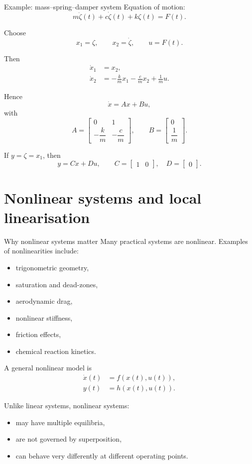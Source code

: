 \documentclass[aspectratio=169,10pt]{beamer}
\begin{document}
\begin{frame}{Example: mass--spring--damper system}
Equation of motion:
\[
m\ddot{\zeta}(t)+c\dot{\zeta}(t)+k\zeta(t)=F(t).
\]

Choose
\[
x_1=\zeta,\qquad x_2=\dot{\zeta},\qquad u=F(t).
\]

Then
\begin{align*}
\dot{x}_1 &= x_2,\\
\dot{x}_2 &= -\frac{k}{m}x_1-\frac{c}{m}x_2+\frac{1}{m}u.
\end{align*}

Hence
\[
\dot{x}=Ax+Bu,
\]
with
\[
A=
\begin{bmatrix}
0 & 1\\[4pt]
-\dfrac{k}{m} & -\dfrac{c}{m}
\end{bmatrix},
\qquad
B=
\begin{bmatrix}
0\\[4pt]
\dfrac{1}{m}
\end{bmatrix}.
\]

If \(y=\zeta=x_1\), then
\[
y=Cx+Du,\qquad
C=\begin{bmatrix}1 & 0\end{bmatrix},\quad D=\begin{bmatrix}0\end{bmatrix}.
\]
\end{frame}

\section{Nonlinear systems and local linearisation}

\begin{frame}{Why nonlinear systems matter}
Many practical systems are nonlinear.
Examples of nonlinearities include:
\begin{itemize}
  \item trigonometric geometry,
  \item saturation and dead-zones,
  \item aerodynamic drag,
  \item nonlinear stiffness,
  \item friction effects,
  \item chemical reaction kinetics.
\end{itemize}

A general nonlinear model is
\begin{align*}
\dot{x}(t) &= f(x(t),u(t)),\\
y(t) &= h(x(t),u(t)).
\end{align*}

Unlike linear systems, nonlinear systems:
\begin{itemize}
  \item may have multiple equilibria,
  \item are not governed by superposition,
  \item can behave very differently at different operating points.
\end{itemize}
\end{frame}
\end{document}
